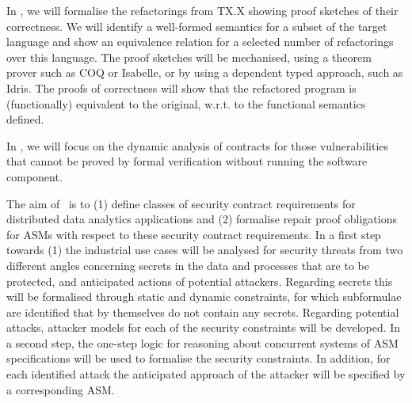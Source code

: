 \begin{Workpackage}{\thewpno}
\begin{Task}

\TaskResults{%
}
\TaskHeader{}

In \theTask, we will formalise the refactorings from TX.X showing proof sketches of their correctness. We will identify a well-formed semantics for a subset of the target language and show an equivalence relation for a selected number of refactorings over this language. The proof sketches will be mechanised, using a theorem prover such as COQ or Isabelle, or by using a dependent typed approach, such as Idris. The proofs of correctness will show that the refactored program is (functionally) equivalent to the original, w.r.t. to the functional semantics defined. 

\end{Task}


\begin{Task}

\TaskResults{%
}
\TaskHeader{}

In \theTask, we will focus on the dynamic analysis of contracts for
those vulnerabilities that cannot be proved by formal verification
without running the software component.
\end{Task}

\begin{Task}

\TaskResults{%
}
\TaskHeader{}

The aim of \theTask\ is to (1) define classes of security contract requirements for distributed data analytics applications and (2) formalise repair proof obligations for ASMs with respect to these security contract requirements. In a first step towards (1) the industrial use cases will be analysed for security threats from two different angles concerning secrets in the data and processes that are to be protected, and anticipated actions of potential attackers. Regarding secrets this will be formalised through static and dynamic constraints, for which subformulae are identified that by themselves do not contain any secrets. Regarding potential attacks, attacker models for each of the security constraints will be developed. In a second step, the one-step logic for reasoning about concurrent systems of ASM specifications will be used to formalise the security constraints. In addition, for each identified attack the anticipated approach of the attacker will be specified by a corresponding ASM.
\end{Task}



\end{Workpackage}
